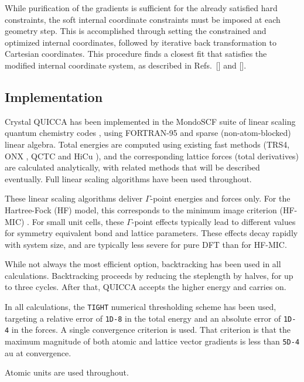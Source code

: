 \twolinestyle{\documentclass[prb,preprint]{revtex4}}
\begin{document}
While purification of the gradients is sufficient for the already satisfied hard constraints,
the soft internal coordinate constraints must be imposed at each geometry step.  This is 
accomplished through setting the constrained and optimized internal coordinates, followed
by iterative back transformation to Cartesian coordinates.  This procedure finds a closest 
fit that satisfies the modified internal coordinate system, as described in 
Refs.~[] and [].

\subsection{Implementation}

Crystal QUICCA has been implemented in the MondoSCF suite of linear scaling 
quantum chemistry codes \cite{MondoSCF}, using FORTRAN-95 and sparse (non-atom-blocked) 
linear algebra.  Total energies are computed using existing fast methods 
(TRS4\cite{ANiklasson03}, ONX \cite{CTymczak05a}, QCTC and HiCu \cite{CTymczak05b}), 
and the corresponding lattice forces 
(total derivatives) are calculated analytically, with related methods that will be 
described eventually. Full linear scaling algorithms have been used throughout.

These linear scaling algorithms deliver $\Gamma$-point energies and forces only.  
For the Hartree-Fock (HF) model, this corresponds to the minimum image criterion 
(HF-MIC) \cite{CTymczak05a}.  For small unit cells, these $\Gamma$-point effects typically lead 
to different values for symmetry equivalent bond and lattice parameters.  These effects 
decay rapidly with system size, and are typically less severe for pure DFT than for HF-MIC.  

While not always the most efficient option, backtracking has been used in all calculations.
Backtracking proceeds by reducing the steplength by halves, for up to three cycles.  
After that, QUICCA accepts the higher energy and carries on.  

In all calculations, the {\tt TIGHT} numerical thresholding scheme \cite{CTymczak05a} has been used, 
targeting a relative error of {\tt 1D-8} in the total energy and an 
absolute error of {\tt 1D-4} in the forces.  A single convergence criterion is used.
That criterion is that the maximum magnitude of both atomic and lattice vector gradients 
is less than {\tt 5D-4} au at convergence.

Atomic units are used throughout.
\end{document}
